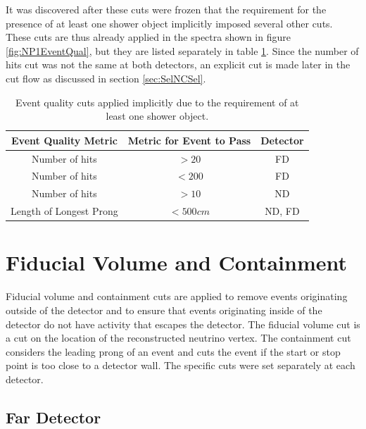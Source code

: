 It was discovered after these cuts were frozen that the requirement for the presence of at least one shower object implicitly imposed several other cuts. These cuts are thus already applied in the spectra shown in figure \ref{fig:NP1EventQual}, but they are listed separately in table \ref{tab:NuePresel}. Since the number of hits cut was not the same at both detectors, an explicit cut is made later in the cut flow as discussed in section \ref{sec:SelNCSel}.
\begin{table}[p]
  \begin{center}
    \begin{tabular}{c c c}
      \hline\hline
      Event Quality Metric & Metric for Event to Pass & Detector \\
      \hline
      Number of hits & $> 20$ & FD \\
      Number of hits & $< 200$ & FD \\
      Number of hits & $> 10$ & ND \\
      Length of Longest Prong & $< 500\unit{cm}$ & ND, FD \\
      \hline
    \end{tabular}
    \caption[Implicit Event Quality Cuts]{Event quality cuts applied implicitly due to the requirement of at least one shower object.}
    \label{tab:NuePresel}
  \end{center}
\end{table}

\section{Fiducial Volume and Containment}
\label{sec:SelFidCont}

Fiducial volume and containment cuts are applied to remove events originating outside of the detector and to ensure that events originating inside of the detector do not have activity that escapes the detector. The fiducial volume cut is a cut on the location of the reconstructed neutrino vertex. The containment cut considers the leading prong of an event and cuts the event if the start or stop point is too close to a detector wall. The specific cuts were set separately at each detector.

\subsection{Far Detector}
\label{sec:SelFidContFD}

